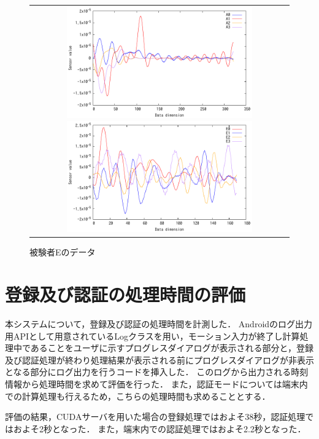\begin{figure}[bthp]
  \centering
  \begin{tabular}{c}
    \begin{minipage}{.48\hsize}
      \centering
      \includegraphics[bb=0 0 360 216, width=8cm]{Graphs/comp_A.pdf}
      \caption{被験者Aのデータ}
      \label{comp-a}
    \end{minipage}
    \begin{minipage}{.48\hsize}
      \centering
      \includegraphics[bb=0 0 360 216, width=8cm]{Graphs/comp_E.pdf}
      \caption{被験者Eのデータ}
      \label{comp-e}
    \end{minipage}
  \end{tabular}
\end{figure}

\section{登録及び認証の処理時間の評価}
本システムについて，登録及び認証の処理時間を計測した．
Androidのログ出力用APIとして用意されているLogクラス\cite{5-log}を用い，モーション入力が終了し計算処理中であることをユーザに示すプログレスダイアログが表示される部分と，登録及び認証処理が終わり処理結果が表示される前にプログレスダイアログが非表示となる部分にログ出力を行うコードを挿入した．
このログから出力される時刻情報から処理時間を求めて評価を行った．
また，認証モードについては端末内での計算処理も行えるため，こちらの処理時間も求めることとする．

評価の結果，CUDAサーバを用いた場合の登録処理ではおよそ38秒，認証処理ではおよそ2秒となった．
また，端末内での認証処理ではおよそ2.2秒となった．

